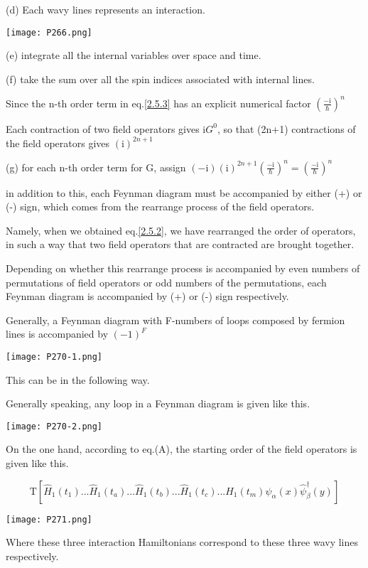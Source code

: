 (d) Each wavy lines represents an interaction.
\begin{center}
\texttt{[image: P266.png]}
\end{center}
(e) integrate all the internal variables over space and time.

(f) take the sum over all the spin indices associated with internal lines.

Since the n-th order term in eq.\ref{2.5.3} has an explicit numerical factor $(\frac{-\mathrm{i}}{\hbar})^n$

Each contraction of two field operators gives $\mathrm{i}G^0$, so that (2n+1) contractions of the field operators gives $(\mathrm{i})^{2n+1}$

(g) for each n-th order term for G, assign $(-\mathrm{i})(\mathrm{i})^{2n+1}(\frac{-\mathrm{i}}{\hbar})^n=(\frac{-\mathrm{i}}{\hbar})^n$

in addition to this, each Feynman diagram must be accompanied by  either (+) or (-) sign, which comes from the rearrange process of the field operators.

Namely, when we obtained eq.\ref{2.5.2}, we have rearranged the order of operators, in such a way that two field operators that are contracted are brought together.

Depending on whether this rearrange process is accompanied by even numbers of permutations of field operators or odd numbers of the permutations, each Feynman diagram is accompanied by (+) or (-) sign respectively.

Generally, a Feynman diagram with F-numbers of loops composed by fermion lines is accompanied by $(-1)^F$
\begin{center}
\texttt{[image: P270-1.png]}
\end{center}
This can be in the following way.

Generally speaking, any loop in a Feynman diagram is given like this.
\begin{center}
\texttt{[image: P270-2.png]}
\end{center}

On the one hand, according to eq.(A), the starting order of the field operators is given like this.

$$\mathrm{T}[\hat H_1(t_1)...\hat H_1(t_a)...\hat H_1(t_b)...\hat H_1(t_c)...\hat H_1(t_m)\hat \psi_{\alpha}(x)\hat \psi_{\beta}^{\dagger}(y)]$$
\begin{center}
\texttt{[image: P271.png]}
\end{center}
Where these three interaction Hamiltonians correspond to these three wavy lines respectively.

